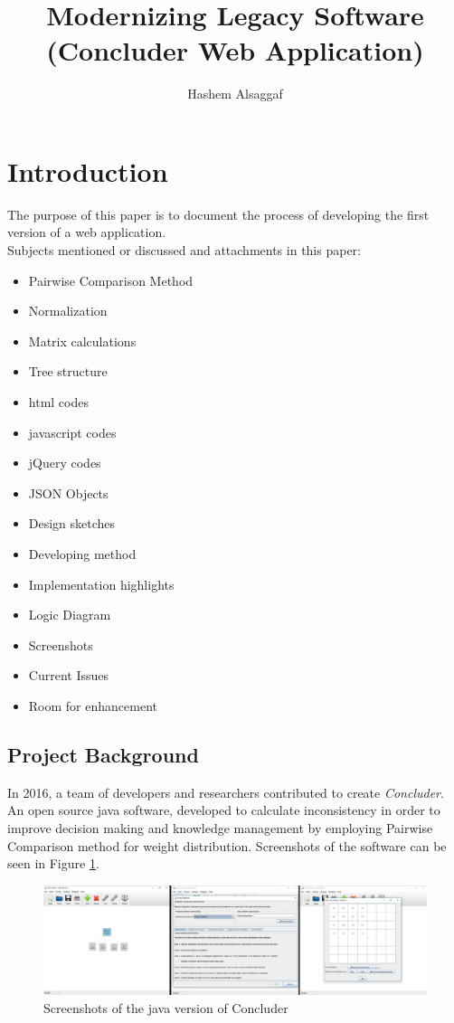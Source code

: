 \documentclass[11pt]{article} %
\title{Modernizing Legacy Software (Concluder Web Application)}
\author{Hashem Alsaggaf}
\begin{document}
\maketitle
\tableofcontents


\section{Introduction}
The purpose of this paper is to document the process of developing the first version of a web application.\\[24pt]
Subjects mentioned or discussed and attachments in this paper:
\begin{itemize}
\item Pairwise Comparison Method
\item Normalization
\item Matrix calculations
\item Tree structure
\item html codes
\item javascript codes
\item jQuery codes
\item JSON Objects
\item Design sketches
\item Developing method
\item Implementation highlights
\item Logic Diagram
\item Screenshots
\item Current Issues
\item Room for enhancement
\end{itemize}

\subsection{Project Background}
In 2016, a team of developers and researchers contributed to create \textit{Concluder}. An open source java software, developed to calculate inconsistency in order to improve decision making and knowledge management by employing Pairwise Comparison method for weight distribution. Screenshots of the software can be seen in Figure \ref{shot:oldConcluder}.



\begin{figure}
    \centering
   
      	 \includegraphics[width=\linewidth]{concluder}
    
    \caption{Screenshots of the java version of Concluder}
    \label{shot:oldConcluder}
\end{figure}
\end{document}
